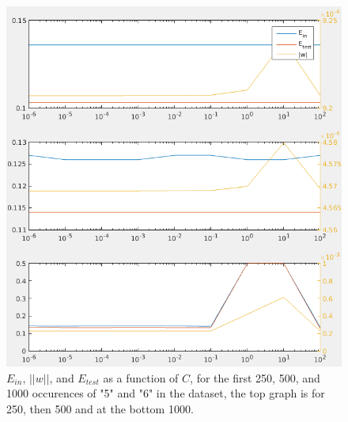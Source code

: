 \documentclass[a4paper]{article}
\begin{document}
\begin{figure}[H]
  \centering
  \includegraphics[width=\textwidth]{./56.png}
  \caption{$E_{in}$, $||w||$, and $E_{test}$ as a function of $C$, for the first 250, 500, and 1000 occurences of "5" and "6" in the dataset, the top graph is for 250, then 500 and at the bottom 1000.}
  \label{dueretulideligtmenneske}
\end{figure}
\end{document}
